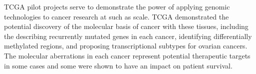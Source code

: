 \acrlong{TCGA} pilot projects \citep{TCGA2008GBM, TCGA2011OV, TCGA2012LUSC} serve to demonstrate the power of applying \gls{genomic} technologies to cancer research at such as scale. \gls{TCGA} demonstrated the potential discovery of the molecular basis of cancer with these tissues, including the describing recurrently mutated genes in each cancer, identifying differentially methylated regions, and proposing transcriptional subtypes for ovarian cancers. The molecular aberrations in each cancer represent potential therapeutic targets in some cases and some were shown to have an impact on patient survival.

